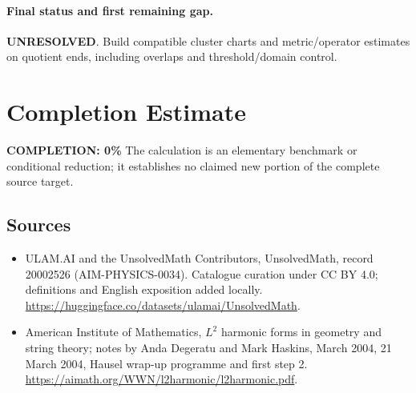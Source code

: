 \documentclass[11pt]{article}
\begin{document}
\paragraph{Final status and first remaining gap.}
\textbf{UNRESOLVED}. Build compatible cluster charts and metric/operator estimates on quotient ends, including overlaps and threshold/domain control.

\section{Completion Estimate}
\noindent\textbf{COMPLETION: 0\%}
The calculation is an elementary benchmark or conditional reduction; it establishes no claimed new portion of the complete source target.

\subsection{Sources}
\begin{itemize}
\item[\hypertarget{source:20002526:1}{S1}] ULAM.AI and the UnsolvedMath Contributors, UnsolvedMath, record 20002526 (AIM-PHYSICS-0034). Catalogue curation under CC BY 4.0; definitions and English exposition added locally.
\url{https://huggingface.co/datasets/ulamai/UnsolvedMath}.
\item[\hypertarget{source:20002526:2}{S2}] American Institute of Mathematics, $L^2$ harmonic forms in geometry and string theory; notes by Anda Degeratu and Mark Haskins, March 2004, 21 March 2004, Hausel wrap-up programme and first step 2.
\url{https://aimath.org/WWN/l2harmonic/l2harmonic.pdf}.
\end{itemize}
\label{end:20002526}
\end{document}
